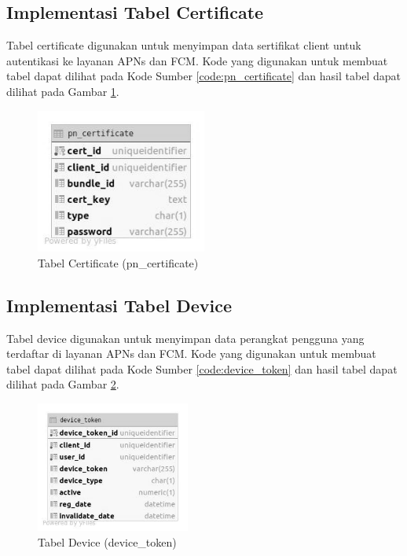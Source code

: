 \subsection{Implementasi Tabel Certificate}
\par Tabel certificate digunakan untuk menyimpan data sertifikat client untuk autentikasi ke layanan APNs dan FCM. Kode yang digunakan untuk membuat tabel dapat dilihat pada Kode Sumber \ref{code:pn_certificate} dan hasil tabel dapat dilihat pada Gambar \ref{tabel_pn_certificate}.

\begin{figure}[H]
    \centering\includegraphics[width=0.5\textwidth]{bab4/figures/tabel_pn_certificate.jpg}
    \caption{Tabel Certificate (pn\_certificate)}
    \label{tabel_pn_certificate}
\end{figure}

\subsection{Implementasi Tabel Device}
\par Tabel device digunakan untuk menyimpan data perangkat pengguna yang terdaftar di layanan APNs dan FCM. Kode yang digunakan untuk membuat tabel dapat dilihat pada Kode Sumber \ref{code:device_token} dan hasil tabel dapat dilihat pada Gambar \ref{tabel_device_token}.

\begin{figure}[H]
    \centering\includegraphics[width=0.45\textwidth]{bab4/figures/tabel_device_token.jpg}
    \caption{Tabel Device (device\_token)}
    \label{tabel_device_token}
\end{figure}

